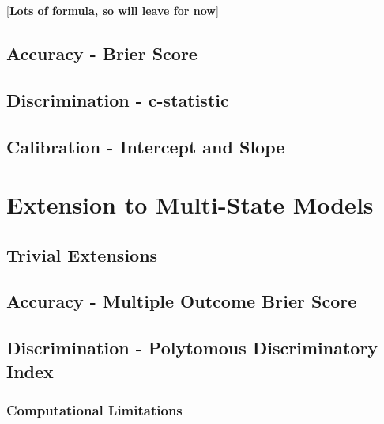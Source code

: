 \documentclass[12pt,twoside]{reedthesis}
\begin{document}
{[}\textbf{Lots of formula, so will leave for now}{]}

\hypertarget{accuracy---brier-score}{%
\subsection{Accuracy - Brier Score}\label{accuracy---brier-score}}

\hypertarget{discrimination---c-statistic}{%
\subsection{Discrimination - c-statistic}\label{discrimination---c-statistic}}

\hypertarget{calibration---intercept-and-slope}{%
\subsection{Calibration - Intercept and Slope}\label{calibration---intercept-and-slope}}

\hypertarget{extension-to-multi-state-models}{%
\section{Extension to Multi-State Models}\label{extension-to-multi-state-models}}

\hypertarget{trivial-extensions}{%
\subsection{Trivial Extensions}\label{trivial-extensions}}

\hypertarget{accuracy---multiple-outcome-brier-score}{%
\subsection{Accuracy - Multiple Outcome Brier Score}\label{accuracy---multiple-outcome-brier-score}}

\hypertarget{discrimination---polytomous-discriminatory-index}{%
\subsection{Discrimination - Polytomous Discriminatory Index}\label{discrimination---polytomous-discriminatory-index}}

\hypertarget{computational-limitations}{%
\subsubsection{Computational Limitations}\label{computational-limitations}}
\end{document}

